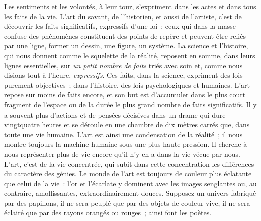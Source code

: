 \documentclass[french,twoside]{book} %
\begin{document}
Les sentiments et les volontés, à leur tour, s’expriment dans les actes et dans tous les faits de la vie. L’art du savant, de l’historien, et aussi de l’artiste, c’est de découvrir les faits significatifs, expressifs d’une loi ; ceux qui dans la masse confuse des phénomènes constituent des points de repère et peuvent être reliés par une ligne, former un dessin, une figure, un système. La science et l’histoire, qui nous donnent comme le squelette de la réalité, reposent en somme, dans leurs lignes essentielles, sur \emph{un petit nombre de faits} triés avec soin et, comme nous disions tout à l’heure, \emph{expressifs}. Ces faits, dans la science, expriment des lois purement objectives ; dans l’histoire, des lois psychologiques et humaines. L’art repose sur moins de faits encore, et son but est d’accumuler dans le plus court fragment de l’espace ou de la durée le plus grand nombre de faits significatifs. Il y a souvent plus d’actions et de pensées décisives dans un drame qui dure vingtquatre heures et se déroule en une chambre de dix mètres carrés que, dans toute une vie humaine. L’art est ainsi une condensation de la réalité ; il nous montre toujours la machine humaine sous une plus haute pression. Il cherche à nous représenter plus de vie encore qu’il n’y en a dans la vie vécue par nous. L’art, c’est de la vie concentrée, qui subit dans cette concentration les différences du caractère des génies. Le monde de l’art est toujours de couleur plus éclatante que celui de la vie : l’or et l’écarlate y dominent avec les images senglantes ou, au contraire, amollissantes, extraordinairement douces. Supposez un univers fabriqué par des papillons, il ne sera peuplé que par des objets de couleur vive, il ne sera éclairé que par des rayons orangés ou rouges ; ainsi font les poètes.
\end{document}
